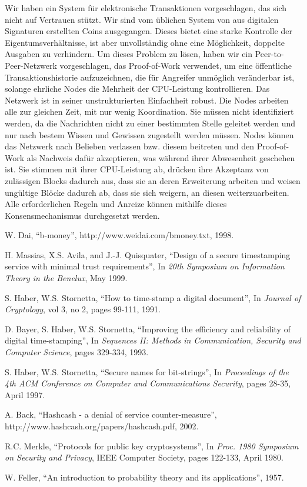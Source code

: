 \documentclass[9pt]{article}
\begin{document}
    Wir haben ein System für elektronische Transaktionen vorgeschlagen, das sich nicht auf Vertrauen stützt. Wir sind vom üblichen System von aus digitalen Signaturen erstellten Coins ausgegangen. Dieses bietet eine starke Kontrolle der Eigentumsverhältnisse, ist aber unvollständig ohne eine Möglichkeit, doppelte Ausgaben zu verhindern. Um dieses Problem zu lösen, haben wir ein Peer-to-Peer-Netzwerk vorgeschlagen, das Proof-of-Work verwendet, um eine öffentliche  Transaktionshistorie aufzuzeichnen, die für Angreifer unmöglich veränderbar ist, solange ehrliche Nodes die Mehrheit der CPU-Leistung kontrollieren. Das Netzwerk ist in seiner unstrukturierten Einfachheit robust. Die Nodes arbeiten alle zur gleichen Zeit, mit nur wenig Koordination. Sie müssen nicht identifiziert werden, da die Nachrichten nicht zu einer bestimmten Stelle geleitet werden und nur nach bestem Wissen und Gewissen zugestellt werden müssen. Nodes können das Netzwerk nach Belieben verlassen bzw. diesem beitreten und den Proof-of-Work als Nachweis dafür akzeptieren, was während ihrer Abwesenheit geschehen ist. Sie stimmen mit ihrer CPU-Leistung ab, drücken ihre Akzeptanz von zulässigen Blocks dadurch aus, dass sie an deren Erweiterung arbeiten und weisen ungültige Blöcke dadurch ab, dass sie sich weigern, an diesen weiterzuarbeiten. Alle erforderlichen Regeln und Anreize können mithilfe dieses Konsensmechanismus durchgesetzt werden.	
    
	\newpage
	
	\begin{thebibliography}{8}
	
		W. Dai, \enquote{b-money}, http://www.weidai.com/bmoney.txt, 1998.
		
		H. Massias, X.S. Avila, and J.-J. Quisquater, \enquote{Design of a secure timestamping service with minimal trust requirements}, In \emph{20th Symposium on Information Theory in the Benelux}, May 1999.
		
		S. Haber, W.S. Stornetta, \enquote{How to time-stamp a digital document}, In \emph{Journal of Cryptology}, vol 3, no 2, pages 99-111, 1991.
		
		D. Bayer, S. Haber, W.S. Stornetta, \enquote{Improving the efficiency and reliability of digital time-stamping}, In \emph{Sequences II: Methods in Communication, Security and Computer Science}, pages 329-334, 1993.
		
		S. Haber, W.S. Stornetta, \enquote{Secure names for bit-strings}, In \emph{Proceedings of the 4th ACM Conference on Computer and Communications Security}, pages 28-35, April 1997.
		
		A. Back, \enquote{Hashcash - a denial of service counter-measure}, \\http://www.hashcash.org/papers/hashcash.pdf, 2002.
		
		R.C. Merkle, \enquote{Protocols for public key cryptosystems}, In \emph{Proc. 1980 Symposium on Security and Privacy}, IEEE Computer Society, pages 122-133, April 1980.
		
		W. Feller, \enquote{An introduction to probability theory and its applications}, 1957.
	\end{thebibliography}
	
\end{document}
